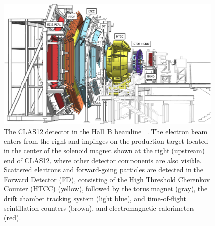 \begin{figure}[h!]
\centering
\includegraphics[width=0.7\columnwidth]{CLAS12-side.png}
\caption{The CLAS12 detector in the Hall~B beamline ~\cite{Burkert:2020akg}. The electron beam enters from the right and impinges on
  the production target located in the center of the solenoid magnet shown at the right (upstream) end of CLAS12,
  where other detector components are also visible. Scattered electrons and forward-going particles are detected
  in the Forward Detector (FD), consisting of the High Threshold Cherenkov Counter (HTCC) (yellow), 
  followed by the torus magnet (gray), the drift chamber tracking system (light blue),
  and time-of-flight scintillation counters (brown), and electromagnetic calorimeters (red). 
  } 
\label{fig:CLAS12}
\end{figure}

